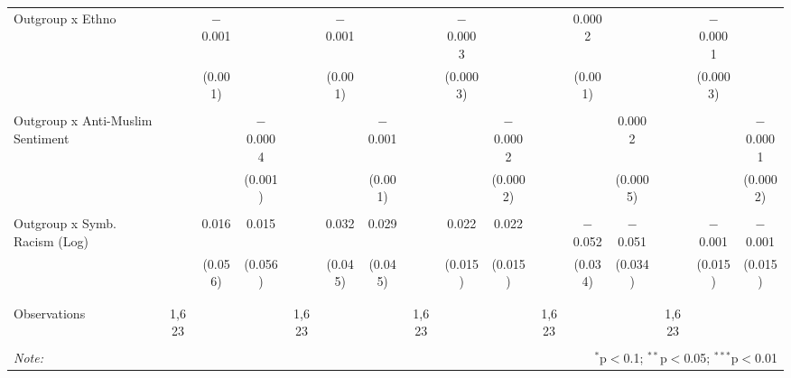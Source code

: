 \begin{table}[H]
{\begin{tabular}{@{\extracolsep{5pt}}lccccccccccccccc}
 Outgroup x Ethno &  & $-$0.001 &  &  & $-$0.001 &  &  & $-$0.0003 &  &  & 0.0002 &  &  & $-$0.0001 &  \\ 
  &  & (0.001) &  &  & (0.001) &  &  & (0.0003) &  &  & (0.001) &  &  & (0.0003) &  \\ 
  & & & & & & & & & & & & & & & \\ 
 Outgroup x Anti-Muslim Sentiment &  &  & $-$0.0004 &  &  & $-$0.001 &  &  & $-$0.0002 &  &  & 0.0002 &  &  & $-$0.0001 \\ 
  &  &  & (0.001) &  &  & (0.001) &  &  & (0.0002) &  &  & (0.0005) &  &  & (0.0002) \\ 
  & & & & & & & & & & & & & & & \\ 
 Outgroup x Symb. Racism (Log) &  & 0.016 & 0.015 &  & 0.032 & 0.029 &  & 0.022 & 0.022 &  & $-$0.052 & $-$0.051 &  & $-$0.001 & $-$0.001 \\ 
  &  & (0.056) & (0.056) &  & (0.045) & (0.045) &  & (0.015) & (0.015) &  & (0.034) & (0.034) &  & (0.015) & (0.015) \\ 
  & & & & & & & & & & & & & & & \\ 
\hline \\[-1.8ex] 
Observations & 1,623 &  &  & 1,623 &  &  & 1,623 &  &  & 1,623 &  &  & 1,623 &  &  \\ 
\hline 
\hline \\[-1.8ex] 
\textit{Note:}  & \multicolumn{15}{r}{$^{*}$p$<$0.1; $^{**}$p$<$0.05; $^{***}$p$<$0.01} \\ 
\end{tabular}} 
\end{table} 
